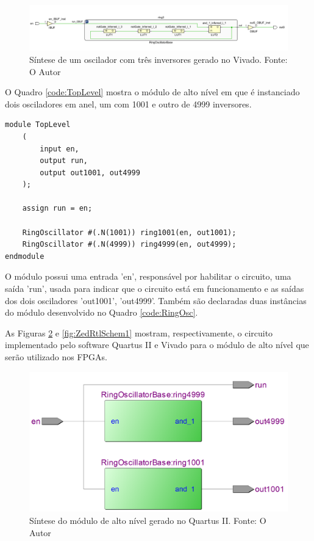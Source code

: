 \begin{figure}[H]
    \centering
    \includegraphics[width=\linewidth]{figures/Metodologia/ZedBoard_Implementation_3Inverter.png}
    \caption{Síntese de um oscilador com três inversores gerado no Vivado. Fonte: O Autor}
    \label{fig:ZedImp3Osc}
\end{figure}

O Quadro \ref{code:TopLevel} mostra o módulo de alto nível em que é instanciado dois osciladores em anel, um com 1001 e outro de 4999 inversores. 

\begin{lstlisting}[label={code:TopLevel}, style=VerilogStyle, caption={Estanciamento dos Módulos. Fonte: O Autor}]
module TopLevel
	(
		input en,
		output run,
		output out1001, out4999
	);
	
	assign run = en;

	RingOscillator #(.N(1001)) ring1001(en, out1001);
	RingOscillator #(.N(4999)) ring4999(en, out4999);
endmodule
\end{lstlisting}

O módulo possui uma entrada 'en', responsável por habilitar o circuito, uma saída 'run', usada para indicar que o circuito está em funcionamento e as saídas dos dois osciladores 'out1001', 'out4999'. Também são declaradas duas instâncias do módulo desenvolvido no Quadro \ref{code:RingOsc}.

As Figuras \ref{fig:DE2RtlSchem} e \ref{fig:ZedRtlSchem1} mostram, respectivamente, o circuito implementado pelo software Quartus II e Vivado para o módulo de alto nível que serão utilizado nos FPGAs.

\begin{figure}[H]
    \centering
    \includegraphics[scale=0.25]{figures/Metodologia/DE2_RTL_Schematic.png}
    \caption{Síntese do módulo de alto nível gerado no Quartus II. Fonte: O Autor}
    \label{fig:DE2RtlSchem}
\end{figure}

